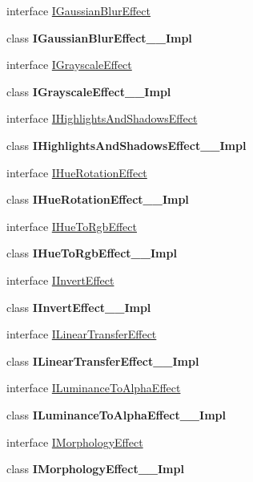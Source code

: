 \begin{DoxyCompactItemize}
\item 
interface \hyperlink{interface_microsoft_1_1_graphics_1_1_canvas_1_1_effects_1_1_i_gaussian_blur_effect}{I\+Gaussian\+Blur\+Effect}
\item 
class {\bfseries I\+Gaussian\+Blur\+Effect\+\_\+\+\_\+\+Impl}
\item 
interface \hyperlink{interface_microsoft_1_1_graphics_1_1_canvas_1_1_effects_1_1_i_grayscale_effect}{I\+Grayscale\+Effect}
\item 
class {\bfseries I\+Grayscale\+Effect\+\_\+\+\_\+\+Impl}
\item 
interface \hyperlink{interface_microsoft_1_1_graphics_1_1_canvas_1_1_effects_1_1_i_highlights_and_shadows_effect}{I\+Highlights\+And\+Shadows\+Effect}
\item 
class {\bfseries I\+Highlights\+And\+Shadows\+Effect\+\_\+\+\_\+\+Impl}
\item 
interface \hyperlink{interface_microsoft_1_1_graphics_1_1_canvas_1_1_effects_1_1_i_hue_rotation_effect}{I\+Hue\+Rotation\+Effect}
\item 
class {\bfseries I\+Hue\+Rotation\+Effect\+\_\+\+\_\+\+Impl}
\item 
interface \hyperlink{interface_microsoft_1_1_graphics_1_1_canvas_1_1_effects_1_1_i_hue_to_rgb_effect}{I\+Hue\+To\+Rgb\+Effect}
\item 
class {\bfseries I\+Hue\+To\+Rgb\+Effect\+\_\+\+\_\+\+Impl}
\item 
interface \hyperlink{interface_microsoft_1_1_graphics_1_1_canvas_1_1_effects_1_1_i_invert_effect}{I\+Invert\+Effect}
\item 
class {\bfseries I\+Invert\+Effect\+\_\+\+\_\+\+Impl}
\item 
interface \hyperlink{interface_microsoft_1_1_graphics_1_1_canvas_1_1_effects_1_1_i_linear_transfer_effect}{I\+Linear\+Transfer\+Effect}
\item 
class {\bfseries I\+Linear\+Transfer\+Effect\+\_\+\+\_\+\+Impl}
\item 
interface \hyperlink{interface_microsoft_1_1_graphics_1_1_canvas_1_1_effects_1_1_i_luminance_to_alpha_effect}{I\+Luminance\+To\+Alpha\+Effect}
\item 
class {\bfseries I\+Luminance\+To\+Alpha\+Effect\+\_\+\+\_\+\+Impl}
\item 
interface \hyperlink{interface_microsoft_1_1_graphics_1_1_canvas_1_1_effects_1_1_i_morphology_effect}{I\+Morphology\+Effect}
\item 
class {\bfseries I\+Morphology\+Effect\+\_\+\+\_\+\+Impl}
\item 

\end{DoxyCompactItemize}
